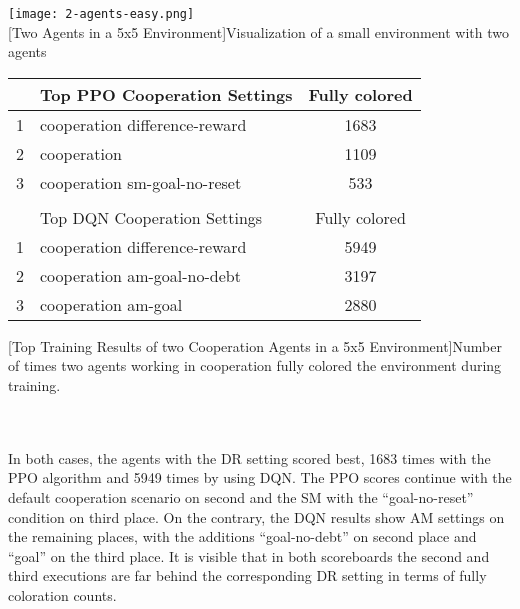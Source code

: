\begin{minipage}{\textwidth}
  \begin{minipage}[b]{0.29\textwidth}
    \centering
    \texttt{[image: 2-agents-easy.png]}\\
    [Two Agents in a 5x5 Environment]{Visualization of a small environment with two agents}\label{fig:2-coop-easy}
  \end{minipage}
  \hfill
    \begin{minipage}[b]{0.69\textwidth}
    \centering
    \begin{tabular}{clc}\hline
         & Top PPO Cooperation Settings & Fully colored \\ \hline
        {\small 1} & cooperation difference-reward & 1683 \\
        {\small 2} & cooperation & 1109 \\
        {\small 3} & cooperation sm-goal-no-reset & 533 \\ \hline
         &   \\ \hline
         & Top DQN Cooperation Settings & Fully colored \\ \hline
        {\small 1} & cooperation difference-reward & 5949 \\
        {\small 2} & cooperation am-goal-no-debt & 3197 \\
        {\small 3} & cooperation am-goal & 2880 \\ \hline
        \end{tabular}
        [Top Training Results of two Cooperation Agents in a 5x5 Environment]{Number of times two agents working in cooperation fully colored the environment during training.\\}\label{t:2-coop-easy}
    \end{minipage}
  \end{minipage}\\\\

In both cases, the agents with the DR setting scored best, 1683 times with the PPO algorithm and 5949 times by using DQN. The PPO scores continue with the default cooperation scenario on second and the SM with the ``goal-no-reset'' condition on third place. On the contrary, the DQN results show AM settings on the remaining places, with the additions ``goal-no-debt'' on second place and ``goal'' on the third place. It is visible that in both scoreboards the second and third executions are far behind the corresponding DR setting in terms of fully coloration counts.

